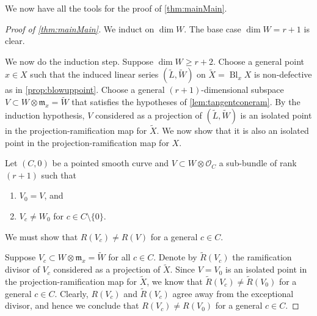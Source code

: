 \documentclass[11pt,reqno]{amsart}
\theoremstyle{plain}
\theoremstyle{definition}
\theoremstyle{remark}
\numberwithin{equation}{section}
\DeclareMathOperator{\Bl}{Bl}
\numberwithin{equation}{section}
\renewcommand{\O}{\mathcal O}
\begin{document}
We now have all the tools for the proof of \autoref{thm:mainMain}. 
\begin{proof}[Proof of \autoref{thm:mainMain}]
  We induct on $\dim W$.
  The base case $\dim W = r+1$ is clear.

  We now do the induction step.
  Suppose $\dim W \geq r+2$.
  Choose a general point $x \in X$ such that the induced linear series $(\widetilde L, \widetilde W)$ on $\widetilde X = \Bl_x X$ is non-defective as in \autoref{prop:blowuppoint}.
  Choose a general $(r+1)$-dimensional subspace $V \subset W \otimes \mathfrak m_x = \widetilde W$ that satisfies the hypotheses of \autoref{lem:tangentconeram}.
  By the induction hypothesis, $V$ considered as a projection of $(\widetilde L, \widetilde W)$ is an isolated point in the projection-ramification map for $\widetilde X$.
  We now show that it is also an isolated point in the projection-ramification map for $X$.

  Let $(C, 0)$ be a pointed smooth curve and $V \subset W \otimes \O_C$ a sub-bundle of rank $(r+1)$ such that
  \begin{enumerate}
  \item $V_{0} = V$, and 
  \item $V_{c} \neq W_{0}$ for $c \in C \setminus \{0\}$.
  \end{enumerate}
  We must show that $R(V_c) \neq R(V)$ for a general $c \in C$.

  Suppose $V_c \subset W \otimes \mathfrak m_x = \widetilde W$ for all $c \in C$.
  Denote by $\widetilde R(V_c)$ the ramification divisor of $V_c$ considered as a projection of $\widetilde X$.
  Since $V = V_0$ is an isolated point in the projection-ramification map for $\widetilde X$, we know that $\widetilde R(V_c) \neq \widetilde R(V_0)$ for a general $c \in C$.
  Clearly, $R(V_c)$ and $\widetilde R(V_c)$ agree away from the exceptional divisor, and hence we conclude that $R(V_c) \neq R(V_0)$ for a general $c \in C$.


\end{proof}
\end{document}
